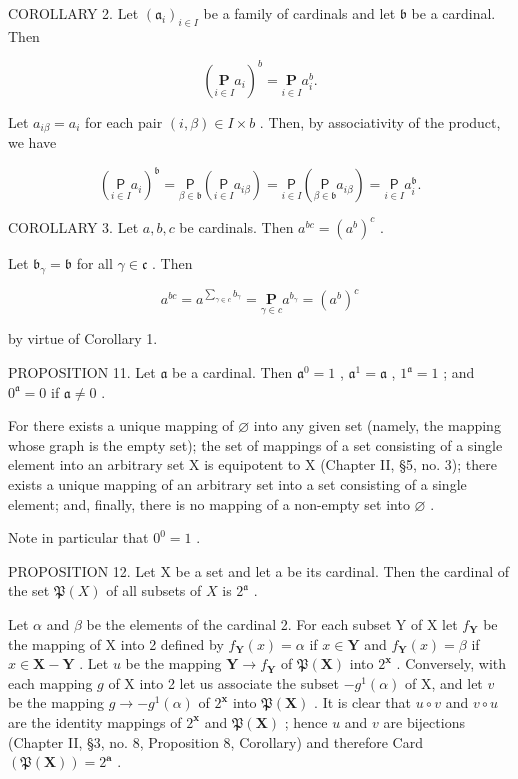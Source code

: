 COROLLARY 2. Let \((\mathfrak{a}_i)_{i\in I}\) be a family of cardinals and let \(\mathfrak{b}\) be a cardinal. Then

\[
\left(\underset {i \in I} {\mathbf {P}} a _ {i}\right) ^ {b} = \underset {i \in I} {\mathbf {P}} a _ {i} ^ {b}.
\]

Let \(a_{i\beta} = a_i\) for each pair \((i, \beta) \in I \times b\) . Then, by associativity of the product, we have

\[
\left(\underset {i \in I} {\mathsf {P}} a _ {i}\right) ^ {\mathfrak {b}} = \underset {\beta \in \mathfrak {b}} {\mathsf {P}} \left(\underset {i \in I} {\mathsf {P}} a _ {i \beta}\right) = \underset {i \in I} {\mathsf {P}} \left(\underset {\beta \in \mathfrak {b}} {\mathsf {P}} a _ {i \beta}\right) = \underset {i \in I} {\mathsf {P}} a _ {i} ^ {\mathfrak {b}}.
\]

COROLLARY 3. Let \(a, b, c\) be cardinals. Then \(a^{bc} = (a^{b})^{c}\) .

Let \(\mathfrak{b}_{\gamma} = \mathfrak{b}\) for all \(\gamma \in \mathfrak{c}\) . Then

\[
a ^ {b c} = a ^ {\sum_ {\gamma \in c} b _ {\gamma}} = \underset {\gamma \in c} {\mathbf {P}} a ^ {b _ {\gamma}} = (a ^ {b}) ^ {c}
\]

by virtue of Corollary 1.

PROPOSITION 11. Let \(\mathfrak{a}\) be a cardinal. Then \(\mathfrak{a}^0 = 1\) , \(\mathfrak{a}^1 = \mathfrak{a}\) , \(1^{\mathfrak{a}} = 1\) ; and \(0^{\mathfrak{a}} = 0\) if \(\mathfrak{a} \neq 0\) .

For there exists a unique mapping of \(\varnothing\) into any given set (namely, the mapping whose graph is the empty set); the set of mappings of a set consisting of a single element into an arbitrary set X is equipotent to X (Chapter II, §5, no. 3); there exists a unique mapping of an arbitrary set into a set consisting of a single element; and, finally, there is no mapping of a non-empty set into \(\varnothing\) .

Note in particular that \(0^{0}=1\) .

PROPOSITION 12. Let X be a set and let a be its cardinal. Then the cardinal of the set \(\mathfrak{P}(X)\) of all subsets of \(X\) is \(2^{\mathfrak{a}}\) .

Let \(\alpha\) and \(\beta\) be the elements of the cardinal 2. For each subset Y of X let \(f_{\mathbf{Y}}\) be the mapping of X into 2 defined by \(f_{\mathbf{Y}}(x) = \alpha\) if \(x \in \mathbf{Y}\) and \(f_{\mathbf{Y}}(x) = \beta\) if \(x \in \mathbf{X} - \mathbf{Y}\) . Let \(u\) be the mapping \(\mathbf{Y} \to f_{\mathbf{Y}}\) of \(\mathfrak{P}(\mathbf{X})\) into \(2^{\mathbf{x}}\) . Conversely, with each mapping \(g\) of X into 2 let us associate the subset \(-g^{1}(\alpha)\) of X, and let \(v\) be the mapping \(g \to -g^{1}(\alpha)\) of \(2^{\mathbf{x}}\) into \(\mathfrak{P}(\mathbf{X})\) . It is clear that \(u \circ v\) and \(v \circ u\) are the identity mappings of \(2^{\mathbf{x}}\) and \(\mathfrak{P}(\mathbf{X})\) ; hence \(u\) and \(v\) are bijections (Chapter II, §3, no. 8, Proposition 8, Corollary) and therefore Card \((\mathfrak{P}(\mathbf{X})) = 2^{\mathbf{a}}\) .


